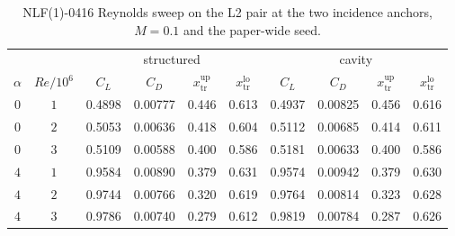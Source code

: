 \begin{table}[H]
  \centering\small
  \caption{NLF(1)-0416 Reynolds sweep on the L2 pair at the two incidence anchors, $M=0.1$ and the paper-wide seed.}
  \label{t:extnlfresweep}
  \begin{tabular}{cc cccc cccc}
    \toprule
    & & \multicolumn{4}{c}{structured} & \multicolumn{4}{c}{cavity} \\
    \cmidrule(lr){3-6}\cmidrule(lr){7-10}
    $\alpha$ & $Re/10^6$ & $C_L$ & $C_D$ & $x_\mathrm{tr}^\mathrm{up}$ & $x_\mathrm{tr}^\mathrm{lo}$
             & $C_L$ & $C_D$ & $x_\mathrm{tr}^\mathrm{up}$ & $x_\mathrm{tr}^\mathrm{lo}$ \\
    \midrule
    $0$ & $1$ & 0.4898 & 0.00777 & 0.446 & 0.613 & 0.4937 & 0.00825 & 0.456 & 0.616 \\
    $0$ & $2$ & 0.5053 & 0.00636 & 0.418 & 0.604 & 0.5112 & 0.00685 & 0.414 & 0.611 \\
    $0$ & $3$ & 0.5109 & 0.00588 & 0.400 & 0.586 & 0.5181 & 0.00633 & 0.400 & 0.586 \\
    $4$ & $1$ & 0.9584 & 0.00890 & 0.379 & 0.631 & 0.9574 & 0.00942 & 0.379 & 0.630 \\
    $4$ & $2$ & 0.9744 & 0.00766 & 0.320 & 0.619 & 0.9764 & 0.00814 & 0.323 & 0.628 \\
    $4$ & $3$ & 0.9786 & 0.00740 & 0.279 & 0.612 & 0.9819 & 0.00784 & 0.287 & 0.626 \\
    \bottomrule
  \end{tabular}
\end{table}
